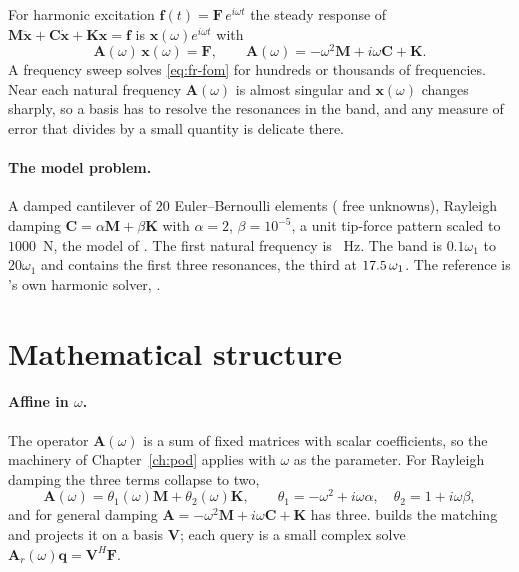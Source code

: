 For harmonic excitation $\bm f(t)=\bm F\,e^{i\omega t}$ the steady response of $\bm M\ddot{\bm x}+\bm C\dot{\bm x}+\bm K\bm x=\bm f$ is $\bm x(\omega)e^{i\omega t}$ with
\begin{equation}\label{eq:fr-fom}
\bm A(\omega)\,\bm x(\omega)=\bm F,\qquad \bm A(\omega)=-\omega^2\bm M+i\omega\bm C+\bm K .
\end{equation}
A frequency sweep solves \eqref{eq:fr-fom} for hundreds or thousands of frequencies. Near each natural frequency $\bm A(\omega)$ is almost singular and $\bm x(\omega)$ changes sharply, so a basis has to resolve the resonances in the band, and any measure of error that divides by a small quantity is delicate there.

\paragraph{The model problem.}
A damped cantilever of $20$ Euler--Bernoulli elements (\cfrNFree{} free unknowns), Rayleigh damping $\bm C=\alpha\bm M+\beta\bm K$ with $\alpha=2$, $\beta=10^{-5}$, a unit tip-force pattern scaled to $1000$~N, the model of . The first natural frequency is \cfrFOne{}~Hz. The band is $0.1\omega_1$ to $20\omega_1$ and contains the first three resonances, the third at $17.5\,\omega_1$. The reference is \fea{}'s own harmonic solver, .

\section{Mathematical structure}\label{sec:fr-math}

\paragraph{Affine in $\omega$.}
The operator $\bm A(\omega)$ is a sum of fixed matrices with scalar coefficients, so the machinery of Chapter~\ref{ch:pod} applies with $\omega$ as the parameter. For Rayleigh damping the three terms collapse to two,
\begin{equation}\label{eq:fr-affine}
\bm A(\omega)=\theta_1(\omega)\bm M+\theta_2(\omega)\bm K,\qquad \theta_1=-\omega^2+i\omega\alpha,\quad \theta_2=1+i\omega\beta,
\end{equation}
and for general damping $\bm A=-\omega^2\bm M+i\omega\bm C+\bm K$ has three.  builds the matching  and projects it on a basis $\bm V$; each query is a small complex solve $\bm A_r(\omega)\bm q=\bm V^H\bm F$.

